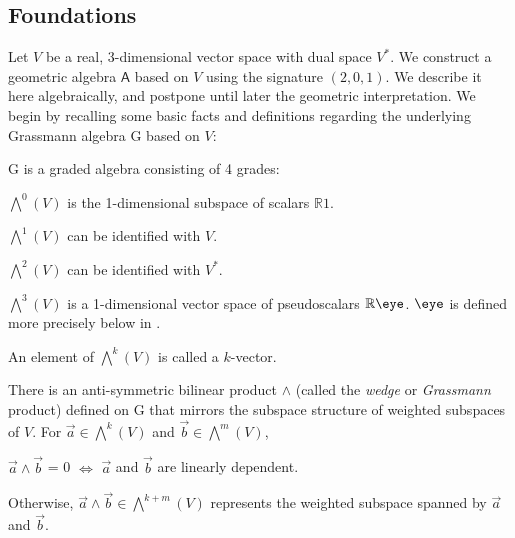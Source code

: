 \documentclass{birkjour}
\newcommand{\vsp}{V\xspace}
\begin{document}
\subsection{Foundations}
Let ${V}$ be a real, 3-dimensional vector space with dual space ${V}^{*}$.  We construct a geometric algebra $\textsf{A}$ based on ${V}$ using the signature $(2,0,1)$. We describe it here algebraically, and postpone until later the geometric interpretation. We begin by recalling some basic facts and definitions regarding the underlying Grassmann algebra \textsf{G} based on $V$:
\begin{compactenum}[$\bullet$]
\item \textsf{G} is a graded algebra consisting of 4 grades:
\begin{compactenum}[$\cdot$]
\item  $\bigwedge^{0}({V})$ is the 1-dimensional subspace of scalars $\mathbb{R}1$.
\item  $\bigwedge^{1}({V})$ can be identified with ${V}$.
\item $\bigwedge^{2}({V})$ can be identified with ${V}^{*}$. 
\item $\bigwedge^{3}({V})$ is a 1-dimensional vector space of pseudoscalars $\mathbb{R}\eye$. $\eye$ is defined more precisely below in . %
\end{compactenum}
\item An element of  $\bigwedge^{k}({V})$ is called a $k$-vector.
\item There is an anti-symmetric bilinear product $\wedge$ (called the \emph{wedge} or \emph{Grassmann} product) defined on \textsf{G} that mirrors the subspace structure of weighted subspaces of $V$. For $\vec{a} \in   \bigwedge^{k}({V})$ and $\vec{b} \in  \bigwedge^{m}({V})$, 
\begin{compactenum}[$\cdot$]
\item  $\vec{a}\wedge\vec{b}$ = 0 $\iff$ $\vec{a}$ and $\vec{b}$ are linearly dependent.
\item  Otherwise, $\vec{a}\wedge\vec{b} \in \bigwedge^{k+m}({V})$ represents the weighted subspace spanned by $\vec{a}$ and $\vec{b}$.
\end{compactenum}

\end{compactenum}
\end{document}
